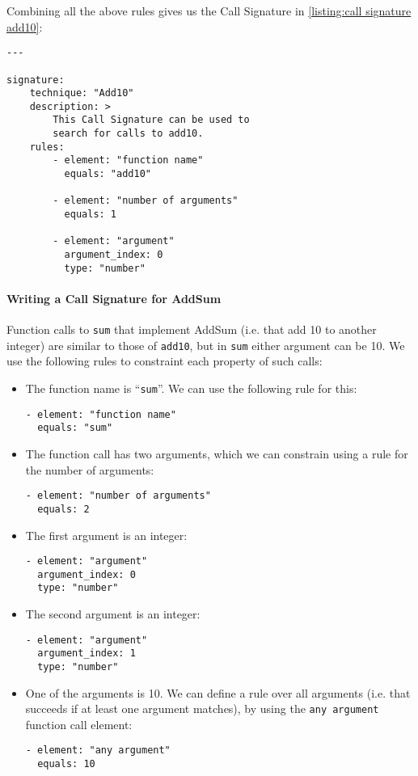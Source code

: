 Combining all the above rules gives us the Call Signature in \autoref{listing:call signature add10}:
\begin{lstlisting}[label={listing:call signature add10}, caption={A Call Signature for \texttt{add10}.}, captionpos=b]
---

signature:
    technique: "Add10"
    description: >
        This Call Signature can be used to
        search for calls to add10.
    rules:
        - element: "function name"
          equals: "add10"

        - element: "number of arguments"
          equals: 1

        - element: "argument"
          argument_index: 0
          type: "number"
\end{lstlisting}


\paragraph{Writing a Call Signature for AddSum}

Function calls to \texttt{sum} that implement AddSum (i.e. that add 10 to another integer) are similar to those of \texttt{add10}, but in \texttt{sum} either argument can be 10. We use the following rules to constraint each property of such calls:
\begin{itemize}
    \item The function name is ``\texttt{sum}''. We can use the following rule for this:
\begin{lstlisting}[captionpos=b]
- element: "function name"
  equals: "sum"
\end{lstlisting}

    \item The function call has two arguments, which we can constrain using a rule for the number of arguments:
\begin{lstlisting}[captionpos=b]
- element: "number of arguments"
  equals: 2
\end{lstlisting}

    \item The first argument is an integer:
\begin{lstlisting}[captionpos=b]
- element: "argument"
  argument_index: 0
  type: "number"
\end{lstlisting}

\item The second argument is an integer:
\begin{lstlisting}[captionpos=b]
- element: "argument"
  argument_index: 1
  type: "number"
\end{lstlisting}

\item One of the arguments is 10. We can define a rule over all arguments (i.e. that succeeds if at least one argument matches), by using the \texttt{any argument} function call element:
\begin{lstlisting}[captionpos=b]
- element: "any argument"
  equals: 10
\end{lstlisting}

\end{itemize}

